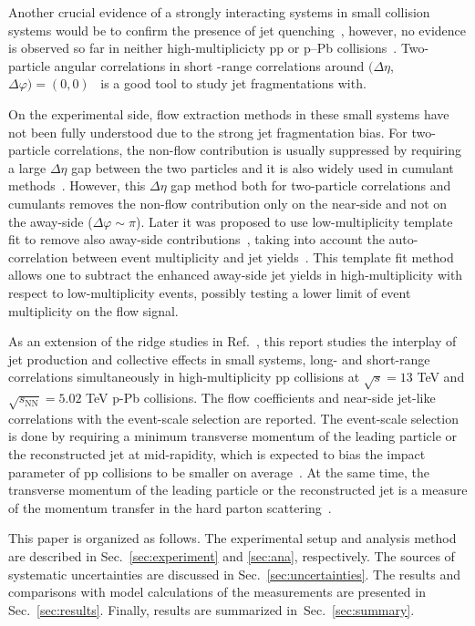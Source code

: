 Another crucial evidence of a strongly interacting systems in small collision systems would be to confirm the presence of jet quenching~\cite{Gyulassy:1990ye,Wang:1991xy}, however, no evidence is observed so far in neither high-multiplicicty pp or p--Pb collisions~\cite{Khachatryan:2016odn,Adam:2016jfp,Adam:2016dau,Acharya:2017okq}. Two-particle angular correlations in short -range correlations around $(\Delta\eta$, $\Delta\varphi)=(0,0)$~\cite{Adam:2016tsv} is a good tool to study jet fragmentations with.

On the experimental side, flow extraction methods in these small systems have not been fully understood due to the strong jet fragmentation bias. 
For two-particle correlations, the non-flow contribution is usually suppressed by requiring a large $\Delta\eta$ gap between the two particles and it is also widely used in cumulant methods~\cite{Bilandzic:2010jr, Acharya:2019vdf}. However, this $\Delta\eta$ gap method both for two-particle correlations and cumulants removes the non-flow contribution only on the near-side and not on the away-side ($\Delta\varphi\sim\pi$). Later it was proposed to use low-multiplicity template fit to remove also away-side contributions~\cite{ATLAS:2015hzw,ATLAS:2016yzd,ATLAS:2018ngv}, taking into account the auto-correlation between event multiplicity and jet yields~\cite{CMS:2013ycn}. This template fit method allows one to subtract the enhanced away-side jet yields in high-multiplicity with respect to low-multiplicity events, possibly testing a lower limit of event multiplicity on the flow signal.

As an extension of the ridge studies in Ref.~\cite{ALICE:2021nir}, this report studies the interplay of jet production and collective effects in small systems, long- and short-range correlations simultaneously in high-multiplicity pp collisions at $\sqrt{s} =13$ TeV and $\sqrt{s_{\mathrm{NN}}}=5.02$ TeV p-Pb collisions. The flow coefficients and near-side jet-like correlations with the event-scale selection are reported. The event-scale selection is done by requiring a minimum transverse momentum of the leading particle or the reconstructed jet at mid-rapidity, which is expected to bias the impact parameter of pp collisions to be smaller on average~\cite{Sjostrand:1986ep,Frankfurt:2010ea}. At the same time, the transverse momentum of the leading particle or the reconstructed jet is a measure of the momentum transfer in the hard parton scattering~\cite{Chatrchyan:2012tt,Chatrchyan:2011id}.

This paper is organized as follows. The experimental setup and analysis method are described in Sec.~\ref{sec:experiment} and \ref{sec:ana}, respectively. The sources of systematic uncertainties are discussed in Sec.~\ref{sec:uncertainties}. The results and comparisons with model calculations of the measurements are presented in Sec.~\ref{sec:results}. Finally, results are summarized in~Sec.~\ref{sec:summary}.

 